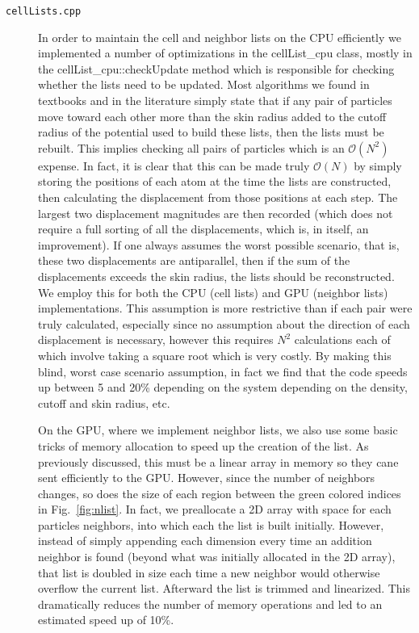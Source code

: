 \documentclass[12pt]{article}
\begin{document}
\begin{description}

\item[\texttt{cellLists.cpp}] In order to maintain the cell and neighbor lists on the CPU efficiently we implemented a number of optimizations in the cellList\_cpu class, mostly in the cellList\_cpu::checkUpdate method which is responsible for checking whether the lists need to be updated.  Most algorithms we found in textbooks and in the literature simply state that if any pair of particles move toward each other more than the skin radius added to the cutoff radius of the potential used to build these lists, then the lists must be rebuilt.  This implies checking all pairs of particles which is an $\mathcal{O}(N^2)$ expense.  In fact, it is clear that this can be made truly $\mathcal{O}(N)$ by simply storing the positions of each atom at the time the lists are constructed, then calculating the displacement from those positions at each step. The largest two displacement magnitudes are then recorded (which does not require a full sorting of all the displacements, which is, in itself, an improvement). If one always assumes the worst possible scenario, that is, these two displacements are antiparallel, then if the sum of the displacements exceeds the skin radius, the lists should be reconstructed.  We employ this for both the CPU (cell lists) and GPU (neighbor lists) implementations.  This assumption is more restrictive than if each pair were truly calculated, especially since no assumption about the direction of each displacement is necessary, however this requires $N^2$ calculations each of which involve taking a square root which is very costly.  By making this blind, worst case scenario assumption, in fact we find that the code speeds up between 5 and 20\% depending on the system depending on the density, cutoff and skin radius, etc.

On the GPU, where we implement neighbor lists, we also use some basic tricks of memory allocation to speed up the creation of the list.  As previously discussed, this must be a linear array in memory so they cane sent efficiently to the GPU.  However, since the number of neighbors changes, so does the size of each region between the green colored indices in Fig.~\ref{fig:nlist}. In fact, we preallocate a 2D array with space for each particles neighbors, into which each the list is built initially.  However, instead of simply appending each dimension every time an addition neighbor is found (beyond what was initially allocated in the 2D array), that list is doubled in size each time a new neighbor would otherwise overflow the current list.  Afterward the list is trimmed and linearized.  This dramatically reduces the number of memory operations and led to an estimated speed up of 10\%.  


\end{description}
\end{document}
